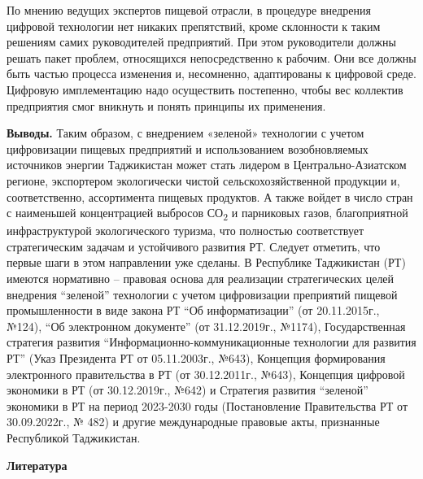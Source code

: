 \begin{multicols}{2}
По мнению ведущих экспертов пищевой отрасли, в процедуре внедрения
цифровой технологии нет никаких препятствий, кроме склонности к таким
решениям самих руководителей предприятий. При этом руководители должны
решать пакет проблем, относящихся непосредственно к рабочим. Они все
должны быть частью процесса изменения и, несомненно, адаптированы к
цифровой среде. Цифровую имплементацию надо осуществить постепенно,
чтобы вес коллектив предприятия смог вникнуть и понять принципы их
применения.

{\bfseries Выводы.} Таким образом, с внедрением «зеленой» технологии с
учетом цифровизации пищевых предприятий и использованием возобновляемых
источников энергии Таджикистан может стать лидером в
Центрально-Азиатском регионе, экспортером экологически чистой
сельскохозяйственной продукции и, соответственно, ассортимента пищевых
продуктов. А также войдет в число стран с наименьшей концентрацией
выбросов СО\textsubscript{2} и парниковых газов, благоприятной
инфраструктурой экологического туризма, что полностью соответствует
стратегическим задачам и устойчивого развития РТ. Следует отметить, что
первые шаги в этом направлении уже сделаны. В Республике Таджикистан
(РТ) имеются нормативно -- правовая основа для реализации стратегических
целей внедрения ``зеленой'' технологии с учетом цифровизации преприятий
пищевой промышленности в виде закона РТ ``Об информатизации'' (от
20.11.2015г., №124), ``Об электронном документе'' (от 31.12.2019г.,
№1174), Государственная стратегия развития
``Информационно-коммуникационные технологии для развития РТ'' (Указ
Президента РТ от 05.11.2003г., №643), Концепция формирования
электронного правительства в РТ (от 30.12.2011г., №643), Концепция
цифровой экономики в РТ (от 30.12.2019г., №642) и Стратегия развития
``зеленой'' экономики в РТ на период 2023-2030 годы (Постановление
Правительства РТ от 30.09.2022г., № 482) и другие международные правовые
акты, признанные Республикой Таджикистан.
\end{multicols}

\begin{center}
{\bfseries Литература}
\end{center}

